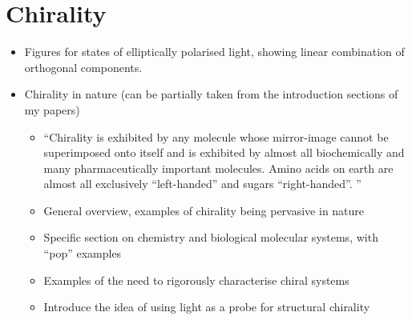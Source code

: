 \chapter{Chirality}\label{sec:background:Chirality}

\begin{itemize}
    \item Figures for states of elliptically polarised light, showing linear combination of orthogonal components.
    \item Chirality in nature (can be partially taken from the introduction sections of my papers)
    \begin{itemize}
        \item ``Chirality is exhibited by any molecule whose mirror-image cannot be superimposed onto itself and is exhibited by almost all biochemically and many pharmaceutically important molecules. Amino acids on earth are almost all exclusively ``left-handed'' and sugars ``right-handed''. ''
        \item General overview, examples of chirality being pervasive in nature
        \item Specific section on chemistry and biological molecular systems, with ``pop'' examples
        \item Examples of the need to rigorously characterise chiral systems
        \item Introduce the idea of using light as a probe for structural chirality
    \end{itemize}
\end{itemize}

